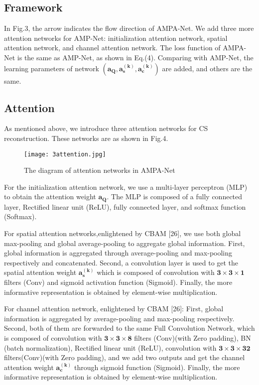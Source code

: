 \documentclass[conference]{IEEEtran}
\begin{document}
\subsection{Framework}
In Fig.3, the arrow indicates the flow direction of AMPA-Net. We add three more attention networks for AMP-Net: initialization attention network, spatial attention network, and channel attention network. The loss function of AMPA-Net is the same as AMP-Net, as shown in Eq.(4). Comparing with AMP-Net, the learning parameters of network $\bm{(a_Q , a_s^{(k)}, a_c^{(k)})}$ are added, and others are the same. 
\subsection{Attention}
As mentioned above, we introduce three attention networks for CS reconstruction. These networks are as shown in Fig.4.
\begin{figure}[h]
\centering
\texttt{[image: 3attention.jpg]} \caption{ The diagram of attention networks in AMPA-Net}
\label{fig:3attention} \end{figure}

For the initialization attention network, we use a multi-layer perceptron (MLP)  to obtain the attention weight $\bm{a_Q}$. The MLP is composed of a fully connected layer, Rectified linear unit (ReLU), fully connected layer, and softmax function (Softmax). 

For spatial attention networks,enlightened by CBAM [26], we use both global max-pooling and global average-pooling to aggregate global information. First, global information is aggregated through average-pooling and max-pooling respectively and concatenated. Second, a convolution layer is used to get the spatial attention weight  $\bm{a_s^{(k)}}$ which is composed of convolution with $\bm{3\times3\times1}$ filters (Conv) and sigmoid activation function (Sigmoid). Finally, the more informative representation is obtained by element-wise multiplication. 

For channel attention network, enlightened by CBAM [26]: First, global information is aggregated by average-pooling and max-pooling respectively. Second, both of them are forwarded to the same Full Convolution Network, which is composed of convolution with $\bm{3\times3\times8}$ filters (Conv)(with Zero padding), BN (batch normalization), Rectified linear unit (ReLU), convolution with $\bm{3\times3\times32}$ filters(Conv)(with Zero padding), and we add two outputs and  get the channel attention weight $\bm{a_c^{(k)}}$ through sigmoid function (Sigmoid). Finally, the more informative representation is obtained by element-wise multiplication.
\end{document}
